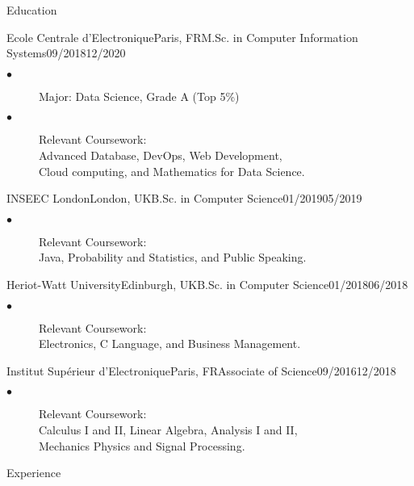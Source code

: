 \documentclass{resume}
\begin{document}
\begin{multicols}{2}
\begin{rSection}{\Large Education}
		\begin{school}{Ecole Centrale d'Electronique}{Paris, FR}{M.Sc. in Computer Information Systems}{09/2018}{12/2020}{
			\begin{description}
				\item[$\bullet$]Major: Data Science, Grade A  (Top 5\%)
				\item[$\bullet$]{Relevant Coursework: \\
				Advanced Database, DevOps, Web Development,\\
				Cloud computing, and Mathematics for Data Science.}
			\end{description}
		}
		\end{school}
		\begin{school}{INSEEC London}{London, UK}{B.Sc. in Computer Science}{01/2019}{05/2019}{
			\begin{description}
				\item[$\bullet$]{Relevant Coursework: \\
				Java, Probability and Statistics, and Public Speaking.}
			\end{description}
		}
		\end{school}
		\begin{school}{Heriot-Watt University}{Edinburgh, UK}{B.Sc. in Computer Science}{01/2018}{06/2018}{
			\begin{description}
				\item[$\bullet$]{Relevant Coursework: \\
				Electronics, C Language, and Business Management.}
			\end{description}
		}
		\end{school}
		\begin{school}{Institut Supérieur d'Electronique}{Paris, FR}{Associate of Science}{09/2016}{12/2018}{
			\begin{description}
				\item[$\bullet$]{Relevant Coursework: \\
				Calculus I and II, Linear Algebra, Analysis I and II, \\
				Mechanics Physics and Signal Processing.}
			\end{description}
		}
		\end{school}
	\end{rSection}

	\begin{rSection}{\Large Experience}


\end{rSection}
\end{multicols}
\end{document}
